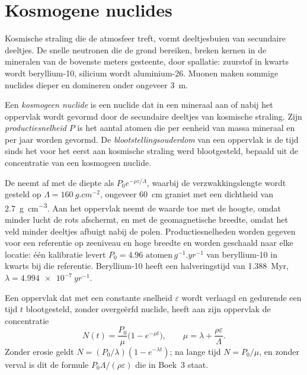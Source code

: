 \section{Kosmogene nuclides}\label{sec:b3:advanced-geochronology:cosmogenic}

Kosmische straling die de atmosfeer treft, vormt deeltjesbuien van secundaire deeltjes. De
snelle neutronen die de grond bereiken, breken kernen in de mineralen van de bovenste
meters gesteente, door spallatie: zuurstof in kwarts wordt beryllium-10, silicium
wordt aluminium-26. Muonen maken sommige nuclides dieper en domineren onder ongeveer
\qty{3}{m}.

\begin{definition}
\label{def:b3:advanced-geochronology:cosmogenic}
Een \emph{kosmogeen nuclide} is een nuclide dat in
een mineraal aan of nabij het oppervlak wordt gevormd door de secundaire deeltjes van kosmische straling. Zijn
\emph{productiesnelheid} $P$ is het aantal
atomen die per eenheid van massa mineraal en per jaar worden gevormd. De
\emph{blootstellingsouderdom} van een oppervlak is de tijd sinds het voor het eerst aan
kosmische straling werd blootgesteld, bepaald uit de concentratie van een kosmogeen nuclide.
\end{definition}

De  neemt af met de diepte als $P_0e^{-\rho z/\Lambda}$, waarbij
de verzwakkingslengte wordt gesteld op $\Lambda = \qty{160}{g.cm^{-2}}$, ongeveer
\qty{60}{cm} graniet met een dichtheid van \qty{2.7}{g.cm^{-3}}. Aan het oppervlak
neemt de waarde toe met de hoogte, omdat minder lucht de rots afschermt, en met
de geomagnetische breedte, omdat het veld minder deeltjes afbuigt nabij de
polen. Productiesnelheden worden gegeven voor een referentie op zeeniveau en hoge breedte en
worden geschaald naar elke locatie: één kalibratie levert $P_0 = \num{4.96}\text{ atomen}\,\unit{g^{-1}.yr^{-1}}$
van beryllium-10 in kwarts bij die referentie. Beryllium-10 heeft een halveringstijd van
\qty{1.388}{Myr}, $\lambda = \qty{4.994e-7}{yr^{-1}}$.

\begin{theorem}\label{thm:b3:advanced-geochronology:exposure}
Een oppervlak dat met een constante snelheid $\varepsilon$ wordt verlaagd en gedurende een tijd $t$ blootgesteld,
zonder overgeërfd nuclide, heeft aan zijn oppervlak de concentratie
\[
N(t) = \frac{P_0}{\mu}\bigl(1 - e^{-\mu t}\bigr), \qquad
\mu = \lambda + \frac{\rho\varepsilon}{\Lambda}.
\]
Zonder erosie geldt $N = (P_0/\lambda)(1 - e^{-\lambda t})$; na lange tijd
$N = P_0/\mu$, en zonder verval is dit de formule $P_0\Lambda/(\rho\varepsilon)$
die in Boek~3 staat.
\end{theorem}

